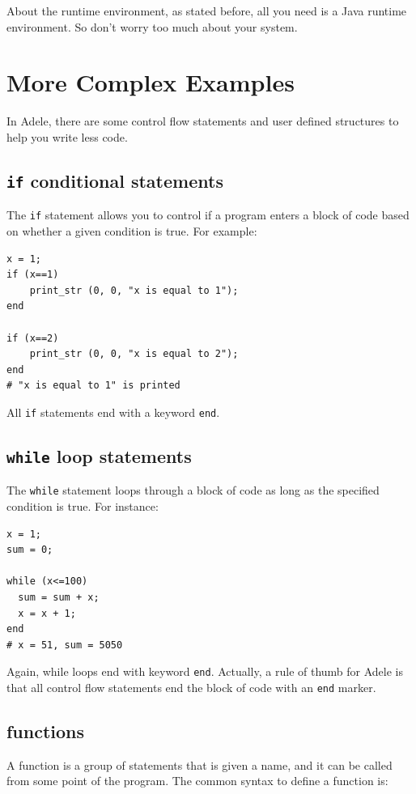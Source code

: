 \documentclass[11pt,letterpaper]{article}
\begin{document}
About the runtime environment, as stated before, all you need is a Java runtime environment. So don't worry too much about your system.

\section {More Complex Examples}
In Adele, there are some control flow statements and user defined structures to help you write less code.

\subsection {\texttt{if} conditional statements}

The \texttt{if} statement allows you to control if a program enters a block of code based on whether a given condition is true. For example:

\begin{lstlisting}[caption=if.adele, label=if, captionpos=b, tabsize=4, frame=single]
x = 1;
if (x==1)
	print_str (0, 0, "x is equal to 1");
end

if (x==2)
	print_str (0, 0, "x is equal to 2");
end
# "x is equal to 1" is printed
\end{lstlisting}

All \texttt{if} statements end with a keyword \texttt{end}.

\subsection {\texttt{while} loop statements}
The \texttt{while} statement loops through a block of code as long as the specified condition is true. For instance:

\begin{lstlisting}[caption=while.adele, label=while, captionpos=b, tabsize=4, frame=single]
x = 1;
sum = 0;

while (x<=100)
  sum = sum + x;
  x = x + 1;
end
# x = 51, sum = 5050
\end{lstlisting}

Again, while loops end with keyword \texttt{end}. Actually, a rule of thumb for Adele is that all control flow statements end the block of code with an \texttt{end} marker.

\subsection {functions}
A function is a group of statements that is given a name, and it can be called from some point of the program. The common syntax to define a function is:
\end{document}

